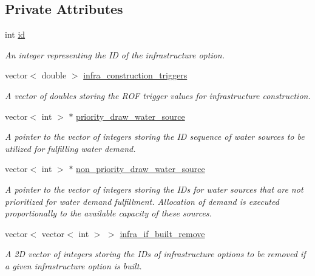 \subsection*{Private Attributes}
\begin{DoxyCompactItemize}
\item 
int \mbox{\hyperlink{classInfrastructureManager_a9c721676ab3c35a247c818bf34fd482e}{id}}
\begin{DoxyCompactList}\small\item\em An integer representing the ID of the infrastructure option. \end{DoxyCompactList}\item 
vector$<$ double $>$ \mbox{\hyperlink{classInfrastructureManager_a5b09482bd9fc258a3da82a86b157a2c3}{infra\+\_\+construction\+\_\+triggers}}
\begin{DoxyCompactList}\small\item\em A vector of doubles storing the R\+OF trigger values for infrastructure construction. \end{DoxyCompactList}\item 
vector$<$ int $>$ $\ast$ \mbox{\hyperlink{classInfrastructureManager_ac8aa84e40d3ef4e4ee7ba6536ca55619}{priority\+\_\+draw\+\_\+water\+\_\+source}}
\begin{DoxyCompactList}\small\item\em A pointer to the vector of integers storing the ID sequence of water sources to be utilized for fulfilling water demand. \end{DoxyCompactList}\item 
vector$<$ int $>$ $\ast$ \mbox{\hyperlink{classInfrastructureManager_a4034272cf63082614f5519b0909acb3d}{non\+\_\+priority\+\_\+draw\+\_\+water\+\_\+source}}
\begin{DoxyCompactList}\small\item\em A pointer to the vector of integers storing the I\+Ds for water sources that are not prioritized for water demand fulfillment. Allocation of demand is executed proportionally to the available capacity of these sources. \end{DoxyCompactList}\item 
vector$<$ vector$<$ int $>$ $>$ \mbox{\hyperlink{classInfrastructureManager_a6505122b584011bd852a126616bf442a}{infra\+\_\+if\+\_\+built\+\_\+remove}}
\begin{DoxyCompactList}\small\item\em A 2D vector of integers storing the I\+Ds of infrastructure options to be removed if a given infrastructure option is built. \end{DoxyCompactList}\item 

\end{DoxyCompactItemize}
